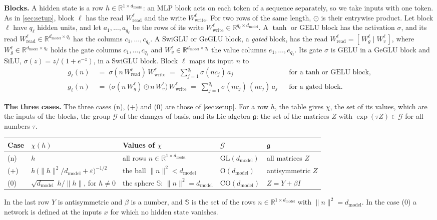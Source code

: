 \documentclass[10pt]{article}
\theoremstyle{definition}
\theoremstyle{remark}
\newcommand{\R}{\mathbb{R}}
\newcommand{\Wread}{W_{\mathrm{read}}}
\newcommand{\Wwrite}{W_{\mathrm{write}}}
\newcommand{\dm}{d_{\mathrm{model}}}
\newcommand{\GL}{\mathrm{GL}}
\newcommand{\Ort}{\mathrm{O}}
\newcommand{\CO}{\mathrm{CO}}
\newcommand{\G}{\mathcal{G}}
\newcommand{\norm}[1]{\lVert #1\rVert}
\newcommand{\para}[1]{\smallskip\noindent\textbf{#1}\hspace{0.5em}}
\begin{document}
\para{Blocks.} A hidden state is a row $h \in \R^{1\times\dm}$: an MLP block acts on each token of a sequence separately, so we take inputs with one token. As in \cref{sec:setup}, block $\ell$ has the read $\Wread^{\ell}$ and the write $\Wwrite^{\ell}$. For two rows of the same length, $\odot$ is their entrywise product. Let block $\ell$ have $q_\ell$ hidden units, and let $a_1, \dots, a_{q_\ell}$ be the rows of its write $\Wwrite^{\ell} \in \R^{q_\ell\times\dm}$. A $\tanh$ or GELU block has the activation $\sigma$, and its read $\Wread^{\ell} \in \R^{\dm\times q_\ell}$ has the columns $c_1, \dots, c_{q_\ell}$. A SwiGLU or GeGLU block, a \emph{gated} block, has the read $\Wread^{\ell} = [\,W_g^{\ell} \mid W_v^{\ell}\,]$, where $W_g^{\ell} \in \R^{\dm\times q_\ell}$ holds the gate columns $c_1, \dots, c_{q_\ell}$ and $W_v^{\ell} \in \R^{\dm\times q_\ell}$ the value columns $e_1, \dots, e_{q_\ell}$. Its gate $\sigma$ is GELU in a GeGLU block and SiLU, $\sigma(z) = z/(1 + e^{-z})$, in a SwiGLU block. Block $\ell$ maps its input $n$ to
\begin{align*}
g_\ell(n) \;&=\; \sigma(n\,\Wread^{\ell})\,\Wwrite^{\ell} \;=\; \sum_{j=1}^{q_\ell}\sigma(nc_j)\,a_j && \text{for a $\tanh$ or GELU block,}\\
g_\ell(n) \;&=\; \big(\sigma(n\,W_g^{\ell})\odot n\,W_v^{\ell}\big)\,\Wwrite^{\ell} \;=\; \sum_{j=1}^{q_\ell}\sigma(nc_j)\,(ne_j)\,a_j && \text{for a gated block.}
\end{align*}

\para{The three cases.} The three cases (n), (+) and (0) are those of \cref{sec:setup}. For a row $h$, the table gives $\chi$, the set of its values, which are the inputs of the blocks, the group $\G$ of the changes of basis, and its Lie algebra $\mathfrak g$: the set of the matrices $Z$ with $\exp(\tau Z) \in \G$ for all numbers $\tau$.
\begin{center}\small
\begin{tabular}{@{}lllll@{}}
\toprule
Case & $\chi(h)$ & Values of $\chi$ & $\G$ & $\mathfrak g$ \\
\midrule
(n) & $h$ & all rows $n \in \R^{1\times\dm}$ & $\GL(\dm)$ & all matrices $Z$ \\[2pt]
(+) & $h\,\big(\norm{h}^2/\dm + \varepsilon\big)^{-1/2}$ & the ball $\norm{n}^2 < \dm$ & $\Ort(\dm)$ & antisymmetric $Z$ \\[2pt]
(0) & $\sqrt{\dm}\;h/\norm{h}$, for $h \neq 0$ & the sphere $\mathbb S$: $\norm{n}^2 = \dm$ & $\CO(\dm)$ & $Z = Y + \beta I$ \\
\bottomrule
\end{tabular}
\end{center}
In the last row $Y$ is antisymmetric and $\beta$ is a number, and $\mathbb S$ is the set of the rows $n \in \R^{1\times\dm}$ with $\norm{n}^2 = \dm$. In the case (0) a network is defined at the inputs $x$ for which no hidden state vanishes.
\end{document}
